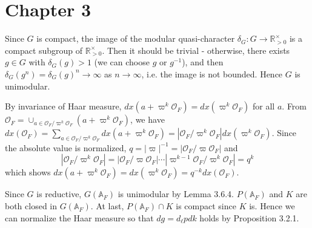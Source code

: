 \newpage
\section{Chapter 3}

\begin{problem} \notfinish
\end{problem}

\begin{problem}
Since $G$ is compact, the image of the modular quasi-character $\delta_{G}: G \to \mathbb{R}_{>0}^{\times}$ is a compact subgroup of $\mathbb{R}_{>0}^{\times}$.
Then it should be trivial - otherwise, there exists $g \in G$ with $\delta_{G}(g) > 1$ (we can choose $g$ or $g^{-1}$), and then $\delta_{G}(g^{n}) = \delta_{G}(g)^{n} \to \infty$
as $n\to\infty$, i.e. the image is not bounded.
Hence $G$ is unimodular.
\end{problem}

\begin{problem} \notfinish
\end{problem}

\begin{problem}
By invariance of Haar measure, $dx(a + \varpi^k \mathcal{O}_F) = dx(\varpi^k \mathcal{O}_F)$ for all $a$.
From $\mathcal{O}_F = \cup_{a \in \mathcal{O}_F / \varpi^k \mathcal{O}_F}(a + \varpi^k \mathcal{O}_F)$, we have $dx(\mathcal{O}_F) = \sum_{a \in \mathcal{O}_F / \varpi^k \mathcal{O}_F} dx(a + \varpi^k \mathcal{O}_F) = |\mathcal{O}_F / \varpi^k \mathcal{O}_F| dx(\varpi^k \mathcal{O}_F)$.
Since the absolute value is normalized, $q = |\varpi|^{-1} = |\mathcal{O}_F/\varpi\mathcal{O}_F|$ and
$$
|\mathcal{O}_F / \varpi^k \mathcal{O}_F| = |\mathcal{O}_F / \varpi \mathcal{O}_F| \cdots |\varpi^{k-1} \mathcal{O}_F / \varpi^{k} \mathcal{O}_F| = q^{k}
$$
which shows $dx(a + \varpi^k \mathcal{O}_F) = dx(\varpi^k \mathcal{O}_F) = q^{-k} dx(\mathcal{O}_F)$.
\end{problem}

\begin{problem}
Since $G$ is reductive, $G(\mathbb{A}_F)$ is unimodular by Lemma 3.6.4.
$P(\mathbb{A}_F)$ and $K$ are both closed in $G(\mathbb{A}_F)$.
At last, $P(\mathbb{A}_F) \cap K$ is compact since $K$ is.
Hence we can normalize the Haar measure so that $dg = d_{\ell}p dk$ holds by Proposition 3.2.1.
\end{problem}

\begin{problem} \notfinish
\end{problem}


